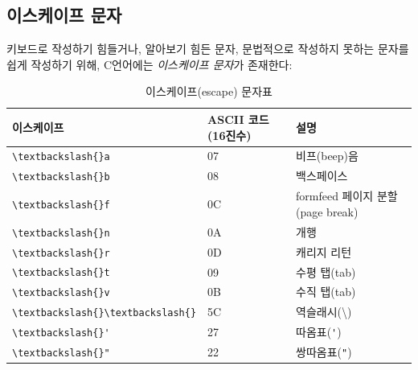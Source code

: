 \documentclass[a4paper,12pt]{book}
\newcommand{\V}[1]{\Verb|#1|}
\begin{document}
\begin{appendices}

\section{이스케이프 문자}
\label{sec:escapes}

키보드로 작성하기 힘들거나, 알아보기 힘든 문자,
문법적으로 작성하지 못하는 문자를 쉽게 작성하기 위해,
C언어에는 \textit{이스케이프 문자}가 존재한다:

\begingroup
    \centering
    \begin{longtable}{ || m{6em} | m{10em} | m{13em} || }
        \caption{이스케이프(escape) 문자표}

        \hline 이스케이프 & ASCII 코드 (16진수) & 설명 \\
        \hline
        \hline\V{\textbackslash{}a}                  & 07                & 비프(beep)음                                                 \\
        \hline\V{\textbackslash{}b}                  & 08                & 백스페이스                                                   \\
        \hline\V{\textbackslash{}f}                  & 0C                & formfeed 페이지 분할(page break)                             \\
        \hline\V{\textbackslash{}n}                  & 0A                & 개행                                                         \\
        \hline\V{\textbackslash{}r}                  & 0D                & 캐리지 리턴                                                  \\
        \hline\V{\textbackslash{}t}                  & 09                & 수평 탭(tab)                                                 \\
        \hline\V{\textbackslash{}v}                  & 0B                & 수직 탭(tab)                                                 \\
        \hline\V{\textbackslash{}\textbackslash{}}   & 5C                & 역슬래시(\textbackslash{})                                   \\
        \hline\V{\textbackslash{}'}                  & 27                & 따옴표(\V{'})                                                \\
        \hline\V{\textbackslash{}"}                  & 22                & 쌍따옴표(\V{"})                                              \\

\end{longtable}
\end{appendices}
\end{document}
